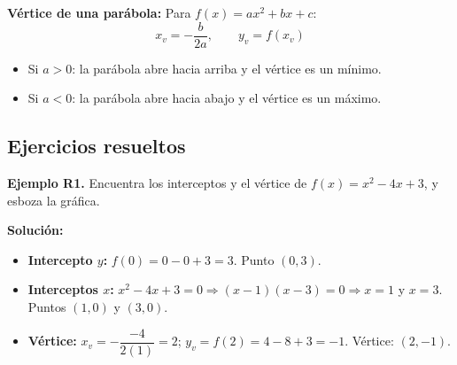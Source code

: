 \documentclass[12pt, letterpaper]{article}
\begin{document}
\begin{cuadroadvertencia}
  \textbf{Vértice de una parábola:} Para $f(x) = ax^2 + bx + c$:
  $$x_v = -\frac{b}{2a}, \qquad y_v = f(x_v)$$
  \begin{itemize}
    \item Si $a > 0$: la parábola abre hacia arriba y el vértice es un mínimo.
    \item Si $a < 0$: la parábola abre hacia abajo y el vértice es un máximo.
  \end{itemize}
\end{cuadroadvertencia}

\newpage

\subsection{Ejercicios resueltos}

\textbf{Ejemplo R1.} Encuentra los interceptos y el vértice de $f(x) = x^2 - 4x + 3$, y esboza la gráfica.

\begin{cuadrosolucion}
  \textbf{Solución:}
  \begin{itemize}
    \item \textbf{Intercepto $y$:} $f(0) = 0 - 0 + 3 = 3$. Punto $(0, 3)$.
    \item \textbf{Interceptos $x$:} $x^2 - 4x + 3 = 0 \Rightarrow (x - 1)(x - 3) = 0 \Rightarrow x = 1$ y $x = 3$. Puntos $(1, 0)$ y $(3, 0)$.
    \item \textbf{Vértice:} $x_v = -\dfrac{-4}{2(1)} = 2$; $y_v = f(2) = 4 - 8 + 3 = -1$. Vértice: $(2, -1)$.
  \end{itemize}
  \begin{center}
  \end{center}
\end{cuadrosolucion}
\end{document}
